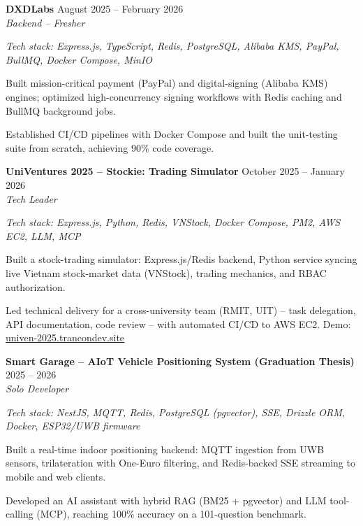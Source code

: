 \documentclass[10pt,a4paper]{article}
\renewcommand{\section}[1]{%
  \par\vspace{3.5pt}%
  \noindent{\large\bfseries\color{accentcolor}#1}\par
  \nointerlineskip\vspace{-1pt}%
  \noindent{\color{accentcolor}\rule{\linewidth}{0.8pt}}\par
  \nointerlineskip\vspace{2pt}%
}
\renewenvironment{itemize}
  {\begin{list}{{\color{accentcolor}\small\raisebox{0.1em}{$\bullet$}}}%
     {\setlength{\leftmargin}{1.1em}%
      \setlength{\itemindent}{0pt}%
      \setlength{\itemsep}{1pt}%
      \setlength{\parsep}{0pt}%
      \setlength{\topsep}{1pt}%
      \setlength{\listparindent}{0pt}}%
      \RaggedRight}
  {\end{list}}
\newcommand{\jobheader}[3]{
  \textbf{#1} \hfill #2 \\
  \textit{#3}
}
\newcommand{\techstack}[1]{
  \par{\small\color{stackgray}\textit{Tech stack: #1}}
}
\begin{document}
\jobheader{DXDLabs}{August 2025 -- February 2026}{Backend -- Fresher}
\techstack{Express.js, TypeScript, Redis, PostgreSQL, Alibaba KMS, PayPal, BullMQ, Docker Compose, MinIO}
\begin{itemize}
  \item Built mission-critical payment (PayPal) and digital-signing (Alibaba KMS) engines; optimized high-concurrency signing workflows with Redis caching and BullMQ background jobs.
  \item Established CI/CD pipelines with Docker Compose and built the unit-testing suite from scratch, achieving 90\% code coverage.
\end{itemize}

\section{Personal Projects}

\jobheader{UniVentures 2025 -- Stockie: Trading Simulator}{October 2025 -- January 2026}{Tech Leader}
\techstack{Express.js, Python, Redis, VNStock, Docker Compose, PM2, AWS EC2, LLM, MCP}
\begin{itemize}
  \item Built a stock-trading simulator: Express.js/Redis backend, Python service syncing live Vietnam stock-market data (VNStock), trading mechanics, and RBAC authorization.
  \item Led technical delivery for a cross-university team (RMIT, UIT) -- task delegation, API documentation, code review -- with automated CI/CD to AWS EC2. Demo: \href{https://univen-2025.trancondev.site}{univen-2025.trancondev.site}
\end{itemize}

\jobheader{Smart Garage -- AIoT Vehicle Positioning System (Graduation Thesis)}{2025 -- 2026}{Solo Developer}
\techstack{NestJS, MQTT, Redis, PostgreSQL (pgvector), SSE, Drizzle ORM, Docker, ESP32/UWB firmware}
\begin{itemize}
  \item Built a real-time indoor positioning backend: MQTT ingestion from UWB sensors, trilateration with One-Euro filtering, and Redis-backed SSE streaming to mobile and web clients.
  \item Developed an AI assistant with hybrid RAG (BM25 + pgvector) and LLM tool-calling (MCP), reaching 100\% accuracy on a 101-question benchmark.
\end{itemize}

\section{Education}
\end{document}
